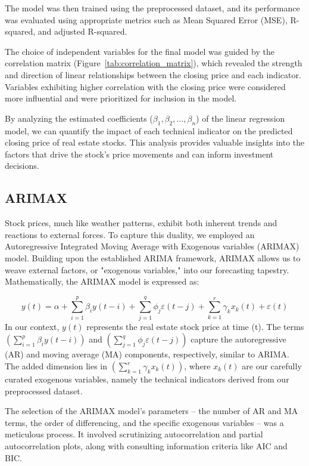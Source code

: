 \documentclass{ieeeojies}
\begin{document}
The model was then trained using the preprocessed dataset, and its performance was evaluated using appropriate metrics such as Mean Squared Error (MSE), R-squared, and adjusted R-squared.

The choice of independent variables for the final model was guided by the correlation matrix (Figure~\ref{tab:correlation_matrix}), which revealed the strength and direction of linear relationships between the closing price and each indicator. Variables exhibiting higher correlation with the closing price were considered more influential and were prioritized for inclusion in the model.

By analyzing the estimated coefficients (\( \beta_1, \beta_2, ..., \beta_n \)) of the linear regression model, we can quantify the impact of each technical indicator on the predicted closing price of real estate stocks. This analysis provides valuable insights into the factors that drive the stock's price movements and can inform investment decisions.
  \subsection{ARIMAX}
  Stock prices, much like weather patterns, exhibit both inherent trends and reactions to external forces. To capture this duality, we employed an Autoregressive Integrated Moving Average with Exogenous variables (ARIMAX) model. Building upon the established ARIMA framework, ARIMAX allows us to weave external factors, or "exogenous variables," into our forecasting tapestry.
  Mathematically, the ARIMAX model is expressed as:
  
  \[y(t) = \alpha + \sum_{i=1}^{p} \beta_i y(t-i) + \sum_{j=1}^{q} \phi_j \varepsilon(t-j) + \sum_{k=1}^{r} \gamma_k x_k(t) + \varepsilon(t)\]
In our context, $y(t)$ represents the real estate stock price at time (t). The terms  $(\sum_{i=1}^{p} \beta_i y(t-i))$ and $(\sum_{j=1}^{q} \phi_j \varepsilon(t-j))$ capture the autoregressive (AR) and moving average (MA) components, respectively, similar to ARIMA. The added dimension lies in $(\sum_{k=1}^{r} \gamma_k x_k(t))$, where $x_k(t)$ are our carefully curated exogenous variables, namely the technical indicators derived from our preprocessed dataset.

The selection of the ARIMAX model's parameters – the number of AR and MA terms, the order of differencing, and the specific exogenous variables – was a meticulous process. It involved scrutinizing autocorrelation and partial autocorrelation plots, along with consulting information criteria like AIC and BIC.
\end{document}
